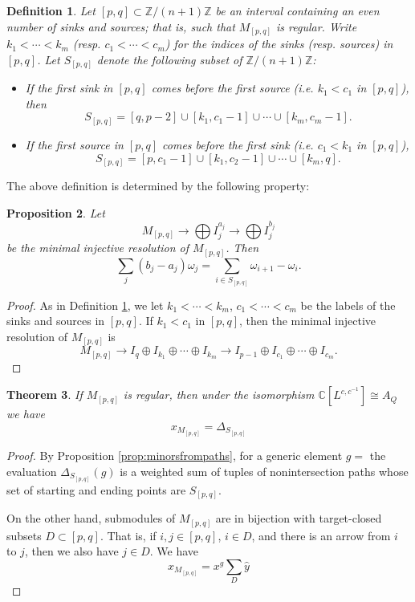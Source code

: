\documentclass[11pt]{amsart}
\newcommand{\CC}{\mathbb{C}}
\newcommand{\ZZ}{\mathbb{Z}}
\newtheorem{theorem}{Theorem}[section]
\newtheorem{definition}[theorem]{Definition}
\newtheorem{proposition}[theorem]{Proposition}
\numberwithin{equation}{section}
\begin{document}
\begin{definition}\label{def:Spq}
Let $[p,q] \subset \ZZ/(n+1)\ZZ$ be an interval containing an even number of sinks and sources; that is, such that $M_{[p,q]}$ is regular. Write $k_1 < \cdots < k_m$ (resp. $c_1 < \cdots < c_m$) for the indices of the sinks (resp. sources) in $[p,q]$. Let $S_{[p,q]}$ denote the following subset of $\ZZ/(n+1)\ZZ$:
\begin{itemize}
\item If the first sink in $[p,q]$ comes before the first source (i.e. $k_1 < c_1$ in $[p,q]$), then 
\[
S_{[p,q]} = [q,p-2] \cup [k_1, c_1 -1] \cup \cdots \cup [k_m, c_m - 1].
\]
\item If the first source in $[p,q]$ comes before the first sink (i.e. $c_1 < k_1$ in $[p,q]$),
\[
S_{[p,q]} = [p,c_1-1] \cup [k_1,c_2-1] \cup \cdots \cup [k_m,q].
\]
\end{itemize}
\end{definition}

The above definition is determined by the following property:
\begin{proposition}
Let 
\[
M_{[p,q]} \to \bigoplus I_j^{a_j} \to \bigoplus I_j^{b_j}
\]
be the minimal injective resolution of $M_{[p,q]}$. Then
\[
\sum_j (b_j - a_j)\omega_j = \sum_{i \in S_{[p,q]}} \omega_{i+1} - \omega_i.
\]
\end{proposition}
\begin{proof}
As in Definition \ref{def:Spq}, we let $k_1 < \cdots < k_m$, $c_1 < \cdots < c_m$ be the labels of the sinks and sources in $[p,q]$. If $k_1 < c_1$ in $[p,q]$, then the minimal injective resolution of $M_{[p,q]}$ is
\[
M_{[p,q]} \to I_q \oplus I_{k_1} \oplus \cdots \oplus I_{k_m} \to I_{p-1} \oplus I_{c_1} \oplus \cdots \oplus I_{c_m}.
\]
\end{proof}

\begin{theorem}
If $M_{[p,q]}$ is regular, then under the isomorphism $\CC[L^{c,c^{-1}}] \cong A_Q$ we have
\[ x_{M_{[p,q]}} = \Delta_{S_{[p,q]}}\]  
\end{theorem}
\begin{proof}
By Proposition \ref{prop:minorsfrompaths}, for a generic element $g = $ the evaluation $\Delta_{S_{[p,q]}}(g)$ is a weighted sum of tuples of nonintersection paths whose set of starting and ending points are $S_{[p,q]}$.

On the other hand, submodules of $M_{[p,q]}$ are in bijection with target-closed subsets $D \subset [p,q]$. That is, if $i, j \in [p,q]$, $i \in D$, and there is an arrow from $i$ to $j$, then we also have $j \in D$. We have
\[
x_{M_{[p,q]}} = x^g \sum_D \hat{y}
\]
\end{proof}
\end{document}
